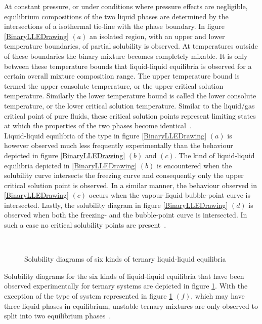 At constant pressure, or under conditions where pressure effects are negligible, equilibrium compositions of the two liquid phases are determined by the intersections of a isothermal tie-line with the phase boundary. In figure \ref{BinaryLLEDrawing} $\left(a\right)$ an isolated region, with an upper and lower temperature boundaries, of partial solubility is observed. At temperatures outside of these boundaries the binary mixture becomes completely mixable. It is only between these temperature bounds that liquid-liquid equilibria is observed for a certain overall mixture composition range. The upper temperature bound is termed the upper consolute temperature, or the upper critical solution temperature. Similarly the lower temperature bound is called the lower consolute temperature, or the lower critical solution temperature. Similar to the liquid/gas critical point of pure fluids, these critical solution points represent limiting states at which the properties of the two phases become identical~\cite{SmithNessAbbott, GasLiquidProperties, ThermophysicalProperties}.\\

Liquid-liquid equilibria of the type in figure \ref{BinaryLLEDrawing} $\left(a\right)$ is however observed much less frequently experimentally than the behaviour depicted in figure \ref{BinaryLLEDrawing} $\left(b\right)$ and $\left(c\right)$. The kind of liquid-liquid equilibria depicted in \ref{BinaryLLEDrawing} $\left(b\right)$ is encountered when the solubility curve intersects the freezing curve and consequently only the upper critical solution point is observed. In a similar manner, the behaviour observed in \ref{BinaryLLEDrawing} $\left(c\right)$ occurs when the vapour-liquid bubble-point curve is intersected. Lastly, the solubility diagram in figure \ref{BinaryLLEDrawing} $\left(d\right)$  is observed when both the freezing- and the bubble-point curve is intersected. In such a case no critical solubility points are present~\cite{SmithNessAbbott, ThermophysicalProperties}.\\

\begin{figure}%
\begin{center}
\resizebox{0.8\textwidth}{!}{}\\
\end{center}
\caption{Solubility diagrams of six kinds of ternary liquid-liquid equilibria} \label{TernaryLLEDrawing}
\end{figure}	

Solubility diagrams for the six kinds of liquid-liquid equilibria that have been observed experimentally for ternary systems are depicted in figure \ref{TernaryLLEDrawing}. With the exception of the type of system represented in figure \ref{TernaryLLEDrawing} $\left(f\right)$, which may have three liquid phases in equilibrium, unstable ternary mixtures are only observed to split into two equilibrium phases~\cite{Dechema, LLECalculation, TernaryLLECalculation}.\


